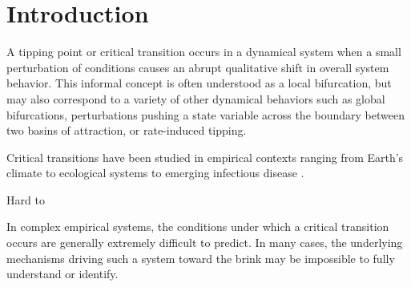 \section{Introduction}
\label{sec:intro}

A tipping point or critical transition occurs in a dynamical system when a small perturbation of conditions causes an abrupt qualitative shift in overall system behavior. This informal concept is often understood as a local bifurcation, but may also correspond to a variety of other dynamical behaviors such as global bifurcations, perturbations pushing a state variable across the boundary between two basins of attraction, or rate-induced tipping. 

Critical transitions have been studied in empirical contexts ranging from Earth's climate \cite{lentonTippingElementsEarth2008} to ecological systems \cite{schefferCatastrophicRegimeShifts2003} to emerging infectious disease \cite{brettDynamicalFootprintsEnable2020}. 

Hard to 


In complex empirical systems, the conditions under which a critical transition occurs are generally extremely difficult to predict. In many cases, the underlying mechanisms driving such a system toward the brink may be impossible to fully understand or identify. 

